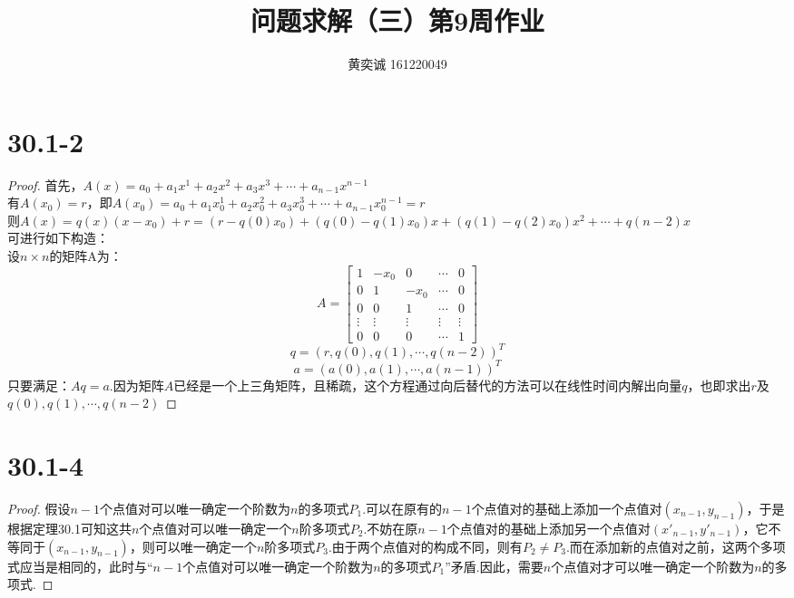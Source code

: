 \documentclass[twocolumn]{article}
\newenvironment{SChinese}{
	\CJKfamily{gbsn}
	\CJKtilde
	\CJKnospace}{}
\begin{document}
	\begin{CJK}{UTF8}{}	
		\begin{SChinese}	
			\title{问题求解（三）第9周作业}
			\author{黄奕诚 161220049}
			\maketitle
			
			\section*{30.1-2}
				\begin{proof}
					首先，$A(x)=a_0+a_1x^1+a_2x^2+a_3x^3+\cdots+a_{n-1}x^{n-1}$\\
					有$A(x_0)=r$，即$A(x_0)=a_0+a_1x_0^1+a_2x_0^2+a_3x_0^3+\cdots+a_{n-1}x_0^{n-1}=r$\\
					则$A(x)=q(x)(x-x_0)+r=(r-q(0)x_0)+(q(0)-q(1)x_0)x+(q(1)-q(2)x_0)x^2+\cdots+q(n-2)x$\\
					可进行如下构造：\\
					设$n\times n$的矩阵A为：\begin{displaymath}
					A=\left [\begin{matrix}
					1 & -x_0 & 0 & \cdots & 0 \\
					0 & 1 & -x_0 & \cdots & 0 \\
					0 & 0 & 1 & \cdots & 0 \\
					\vdots & \vdots & \vdots & \vdots & \vdots \\
					0 & 0 & 0 & \cdots & 1 
					\end{matrix}\right]
					\end{displaymath}
					\begin{displaymath}
						q = (r,q(0),q(1),\cdots,q(n-2))^T
					\end{displaymath}
					\begin{displaymath}
					a = (a(0),a(1),\cdots,a(n-1))^T
					\end{displaymath}
					只要满足：$Aq=a$.因为矩阵$A$已经是一个上三角矩阵，且稀疏，这个方程通过向后替代的方法可以在线性时间内解出向量$q$，也即求出$r$及$q(0),q(1),\cdots,q(n-2)$
				\end{proof}
			\section*{30.1-4}
				\begin{proof}
					假设$n-1$个点值对可以唯一确定一个阶数为$n$的多项式$P_1$.可以在原有的$n-1$个点值对的基础上添加一个点值对$(x_{n-1},y_{n-1})$，于是根据定理30.1可知这共$n$个点值对可以唯一确定一个$n$阶多项式$P_2$.不妨在原$n-1$个点值对的基础上添加另一个点值对$(x'_{n-1},y'_{n-1})$，它不等同于$(x_{n-1},y_{n-1})$，则可以唯一确定一个$n$阶多项式$P_3$.由于两个点值对的构成不同，则有$P_2\neq P_3$.而在添加新的点值对之前，这两个多项式应当是相同的，此时与“$n-1$个点值对可以唯一确定一个阶数为$n$的多项式$P_1$”矛盾.因此，需要$n$个点值对才可以唯一确定一个阶数为$n$的多项式.
				\end{proof}

\end{SChinese}
\end{CJK}
\end{document}

